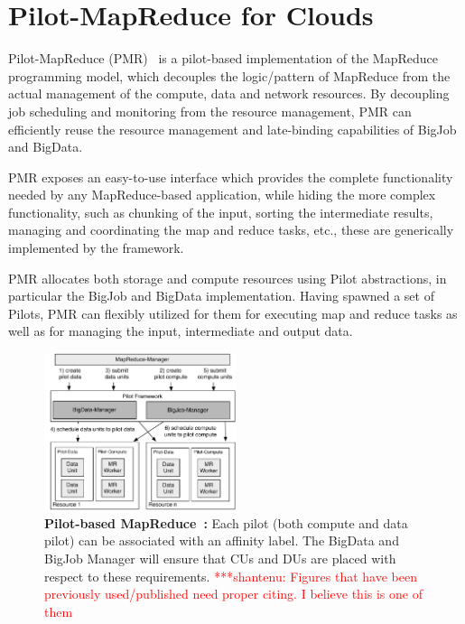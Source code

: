 \documentclass[times]{cpeauth}
\newcommand{\jhanote}[1]{ {\textcolor{red} { ***shantenu: #1 }}}
\newcommand{\jhanote}[1]{}
\newcommand{\pilot}{Pilot\xspace}
\newcommand{\pilots}{Pilots\xspace}
\begin{document}
\section{Pilot-MapReduce for Clouds}

Pilot-MapReduce (PMR)~\cite{Mantha:2012:PEF:2287016.2287020} is a pilot-based
implementation of the MapReduce programming model, which decouples the
logic/pattern of MapReduce from the actual management of the compute, data and
network resources. By decoupling job scheduling and monitoring from the
resource management, PMR can efficiently reuse the resource management and
late-binding capabilities of BigJob and BigData.

PMR exposes an easy-to-use interface which provides the complete
functionality needed by any MapReduce-based application, while hiding
the more complex functionality, such as chunking of the input, sorting
the intermediate results, managing and coordinating the map and reduce
tasks, etc., these are generically implemented by the
framework.

PMR allocates both storage and compute resources using \pilot abstractions, in
particular the BigJob and BigData implementation. Having spawned a set of
\pilots, PMR can flexibly utilized for them for executing map and reduce tasks
as well as for managing the input, intermediate and output data.


\begin{figure}[t]
	\centering
	\includegraphics[width=0.5\textwidth]{figures/mr-arch.pdf}
	\caption{\textbf{Pilot-based 
		MapReduce~\cite{Mantha:2012:PEF:2287016.2287020}:} Each pilot (both
          compute and data pilot) can be associated with an affinity
          label. The BigData and BigJob Manager will ensure that CUs
          and DUs are placed with respect to these
          requirements. \jhanote{Figures that have been previously
            used/published need proper citing. I believe this is one of them}}
	\label{fig:figures_mapreduce-pilotdata}
\end{figure}
\end{document}
